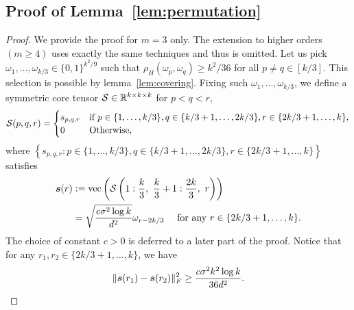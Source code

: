 \documentclass[12pt]{article}
\theoremstyle{definition}
\begin{document}
\subsection{Proof of Lemma~\ref{lem:permutation}}
\begin{proof}
We provide the proof for $m=3$ only. The extension to higher orders $(m\geq 4)$ uses exactly the same techniques and thus is omitted. 
Let us pick $\omega_1,\ldots,\omega_{k/3}\in\{0,1\}^{k^2/9}$ such that $\rho_H(\omega_p,\omega_q)\geq k^2/36$ for all $p\neq q\in [k/3]$. This selection is possible by lemma~\ref{lem:covering}.
Fixing such $\omega_1,\ldots,\omega_{k/3}$, we define a symmetric core tensor $\mathcal{S}\in\mathbb{R}^{k\times k\times k}$ for $p<q<r$,
\begin{align}
    \mathcal{S}(p,q,r) = \begin{cases}s_{p,q,r} &\text{if }p\in\{1,\ldots,k/3\},q\in\{k/3+1,\ldots,2k/3\}, r\in\{2k/3+1,\ldots,k\},\\0 &\text{Otherwise,}
    \end{cases}
\end{align}
where $\left\{s_{p,q,r}\colon p\in\{1,\ldots,k/3\},q\in\{k/3+1,\ldots,2k/3\}, r\in\{2k/3+1,\ldots,k \}\right\}$ satisfies
\begin{align}
\label{eq:structure}
    \ms(r)&:= \text{vec}\left(\tS\left(1:\frac{k}{3},\ \frac{k}{3}+1:\frac{2k}{3},\ r\right)\right)\\
    &= \sqrt{c\sigma^2\log k\over d^{2}}\omega_{r-2k/3} \quad \text{ for any } r\in\{2k/3+1,\ldots,k\}.
\end{align}
The choice of constant $c>0$ is deferred to a later part of the proof.
Notice that for any $r_1,r_2\in\{2k/3+1,\ldots,k\}$, we have
\begin{align}\label{eq:sr}
    \lVert\bm{s}(r_1)-\bm{s}(r_2)\rVert_F^2\geq \frac{c\sigma^2k^2\log k}{36d^2}.
\end{align}


\end{proof}
\end{document}
